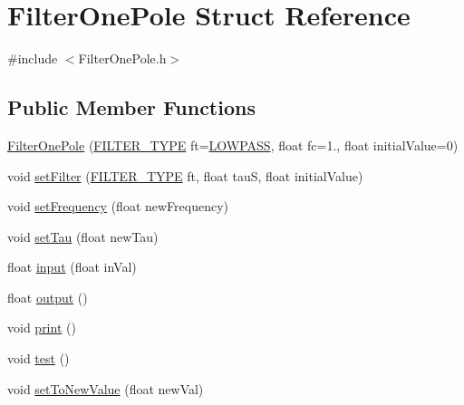 \hypertarget{struct_filter_one_pole}{}\section{Filter\+One\+Pole Struct Reference}
\label{struct_filter_one_pole}


{\ttfamily \#include $<$Filter\+One\+Pole.\+h$>$}

\subsection*{Public Member Functions}
\begin{DoxyCompactItemize}
\item 
\hyperlink{struct_filter_one_pole_adc98d3d03b508f5796c3971c9d0c1f6a}{Filter\+One\+Pole} (\hyperlink{_filter_one_pole_8h_a291796f7a1d5a022401edc940d62db9a}{F\+I\+L\+T\+E\+R\+\_\+\+T\+Y\+PE} ft=\hyperlink{_filter_one_pole_8h_a291796f7a1d5a022401edc940d62db9aa0f056d1892baa220efdb9afeca443025}{L\+O\+W\+P\+A\+SS}, float fc=1., float initial\+Value=0)
\item 
void \hyperlink{struct_filter_one_pole_a7fe2658a2bf6d171895586d0bb9fba8f}{set\+Filter} (\hyperlink{_filter_one_pole_8h_a291796f7a1d5a022401edc940d62db9a}{F\+I\+L\+T\+E\+R\+\_\+\+T\+Y\+PE} ft, float tauS, float initial\+Value)
\item 
void \hyperlink{struct_filter_one_pole_a258a86ec2ee6db608f5839b3b2995185}{set\+Frequency} (float new\+Frequency)
\item 
void \hyperlink{struct_filter_one_pole_a90433addfb2a5509e7ace6c4d5da8fe9}{set\+Tau} (float new\+Tau)
\item 
float \hyperlink{struct_filter_one_pole_a90ad61a0bbbf2b6db7c6b281f2747c24}{input} (float in\+Val)
\item 
float \hyperlink{struct_filter_one_pole_a571c2df141dab2b1072afcd192623f76}{output} ()
\item 
void \hyperlink{struct_filter_one_pole_a352bdb0ad964ec87a1b936409be05087}{print} ()
\item 
void \hyperlink{struct_filter_one_pole_a5b54248319d02b3f15d93e6333339389}{test} ()
\item 
void \hyperlink{struct_filter_one_pole_ad7393515a5f4d972714321a3a2ab7fdd}{set\+To\+New\+Value} (float new\+Val)
\end{DoxyCompactItemize}
